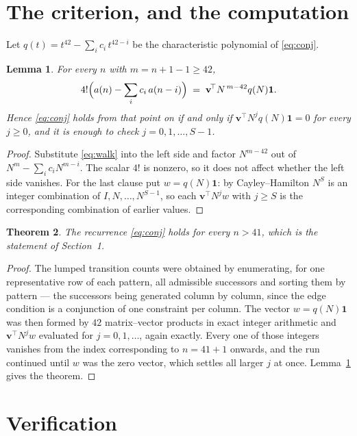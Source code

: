 \documentclass[11pt,a4paper]{article}
\theoremstyle{plain}
\newtheorem{theorem}{Theorem}
\newtheorem{lemma}[theorem]{Lemma}
\theoremstyle{definition}
\begin{document}
\section{The criterion, and the computation}

Let $q(t)=t^{42}-\sum_i c_i\,t^{42-i}$ be the characteristic polynomial of
\eqref{eq:conj}.

\begin{lemma}\label{lem:crit}
For every $n$ with $m=n+1-1\ge42$,
\[
4!\Bigl(a(n)-\sum_i c_i\,a(n-i)\Bigr)\;=\;\mathbf{v}^{\!\top}N^{\,m-42}q(N)\mathbf{1} .
\]
Hence \eqref{eq:conj} holds from that point on if and only if
$\mathbf{v}^{\!\top}N^{j}q(N)\mathbf{1}=0$ for every $j\ge0$, and it is enough to check
$j=0,1,\dots,S-1$.
\end{lemma}

\begin{proof}
Substitute \eqref{eq:walk} into the left side and factor $N^{m-42}$ out of
$N^{m}-\sum_i c_iN^{m-i}$. The scalar $4!$ is nonzero, so it does not affect whether
the left side vanishes. For the last clause put $w=q(N)\mathbf{1}$: by Cayley--Hamilton
$N^{S}$ is an integer combination of $I,N,\dots,N^{S-1}$, so each
$\mathbf{v}^{\!\top}N^{j}w$ with $j\ge S$ is the corresponding combination of earlier
values.
\end{proof}

\begin{theorem}
The recurrence \eqref{eq:conj} holds for every $n>41$, which is the statement of
Section~1.
\end{theorem}

\begin{proof}
The lumped transition counts were obtained by enumerating, for one representative row of
each pattern, all admissible successors and sorting them by pattern --- the successors being
generated column by column, since the edge condition is a conjunction of one constraint per
column. The vector $w=q(N)\mathbf{1}$ was then formed by $42$ matrix--vector products
in exact integer arithmetic and $\mathbf{v}^{\!\top}N^{j}w$ evaluated for
$j=0,1,\dots$, again exactly. Every one of those integers vanishes from the index
corresponding to $n=41+1$ onwards, and the run continued until $w$ was the zero vector,
which settles all larger $j$ at once. Lemma~\ref{lem:crit} gives the theorem.
\end{proof}

\section{Verification}
\end{document}
